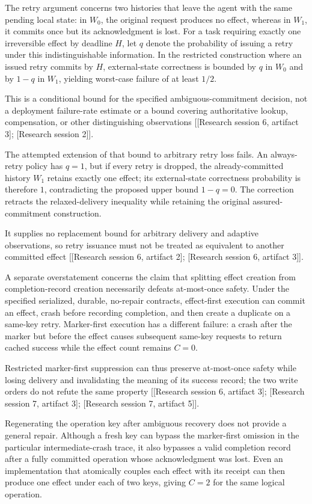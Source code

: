 \documentclass[11pt]{article}
\begin{document}
The retry argument concerns two histories that leave the agent with the same pending local state: in $W_0$, the original request produces no effect, whereas in $W_1$, it commits once but its acknowledgment is lost. For a task requiring exactly one irreversible effect by deadline $H$, let $q$ denote the probability of issuing a retry under this indistinguishable information. In the restricted construction where an issued retry commits by $H$, external-state correctness is bounded by $q$ in $W_0$ and by $1-q$ in $W_1$, yielding worst-case failure of at least $1/2$.

This is a conditional bound for the specified ambiguous-commitment decision, not a deployment failure-rate estimate or a bound covering authoritative lookup, compensation, or other distinguishing observations [[Research session 6, artifact 3]; [Research session 2]].

The attempted extension of that bound to arbitrary retry loss fails. An always-retry policy has $q=1$, but if every retry is dropped, the already-committed history $W_1$ retains exactly one effect; its external-state correctness probability is therefore $1$, contradicting the proposed upper bound $1-q=0$. The correction retracts the relaxed-delivery inequality while retaining the original assured-commitment construction.

It supplies no replacement bound for arbitrary delivery and adaptive observations, so retry issuance must not be treated as equivalent to another committed effect [[Research session 6, artifact 2]; [Research session 6, artifact 3]].

A separate overstatement concerns the claim that splitting effect creation from completion-record creation necessarily defeats at-most-once safety. Under the specified serialized, durable, no-repair contracts, effect-first execution can commit an effect, crash before recording completion, and then create a duplicate on a same-key retry. Marker-first execution has a different failure: a crash after the marker but before the effect causes subsequent same-key requests to return cached success while the effect count remains $C=0$.

Restricted marker-first suppression can thus preserve at-most-once safety while losing delivery and invalidating the meaning of its success record; the two write orders do not refute the same property [[Research session 6, artifact 3]; [Research session 7, artifact 3]; [Research session 7, artifact 5]].

Regenerating the operation key after ambiguous recovery does not provide a general repair. Although a fresh key can bypass the marker-first omission in the particular intermediate-crash trace, it also bypasses a valid completion record after a fully committed operation whose acknowledgment was lost. Even an implementation that atomically couples each effect with its receipt can then produce one effect under each of two keys, giving $C=2$ for the same logical operation.
\end{document}
